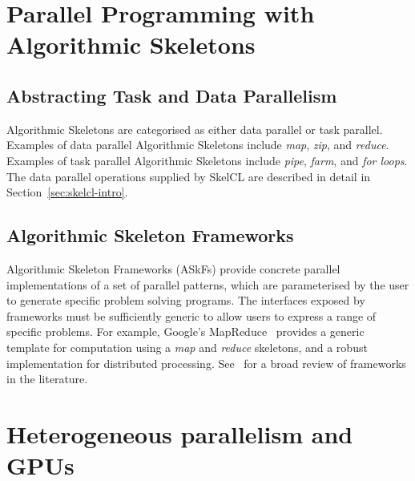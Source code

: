 

\section{Parallel Programming with Algorithmic Skeletons}




\subsection{Abstracting Task and Data Parallelism}

Algorithmic Skeletons are categorised as either data parallel or task
parallel.  Examples of data parallel
Algorithmic Skeletons include \emph{map}, \emph{zip}, and
\emph{reduce}. Examples of task parallel Algorithmic Skeletons include
\emph{pipe}, \emph{farm}, and \emph{for loops}. The data parallel
operations supplied by SkelCL are described in detail in
Section~\ref{sec:skelcl-intro}.


\subsection{Algorithmic Skeleton Frameworks}

Algorithmic Skeleton Frameworks (ASkFs) provide concrete parallel
implementations of a set of parallel patterns, which are parameterised
by the user to generate specific problem solving programs. The
interfaces exposed by frameworks must be sufficiently generic to allow
users to express a range of specific problems. For example, Google's
MapReduce~\cite{Dean2008} provides a generic template for computation
using a \emph{map} and \emph{reduce} skeletons, and a robust
implementation for distributed processing.  See~\cite{Gonzalez2010}
for a broad review of frameworks in the literature.



\section{Heterogeneous parallelism and GPUs}

